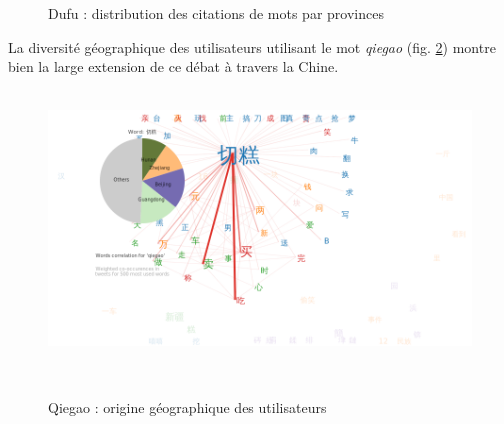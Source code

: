 \begin{figure}[htbp]
{    }
    \newline
    \caption{
      Dufu : distribution des citations de mots par provinces 
    }
    \label{fig:dufu-words-pie}
\end{figure}



\newpage

La diversité géographique des utilisateurs utilisant le mot \textit{qiegao} (fig. \ref{fig:qiegao-words-pie}) montre bien la large extension de ce débat à travers la Chine.

\begin{figure}[htbp]
    \centering
    \hfill \\
    \includegraphics[scale=0.7]{figures/chap4/words_pie_qiegao_Nov_19_2012_Dec_16_2012}
    \caption{
      Qiegao : origine géographique des utilisateurs
    }
    \hfill \\
    \label{fig:qiegao-words-pie}
\end{figure}

